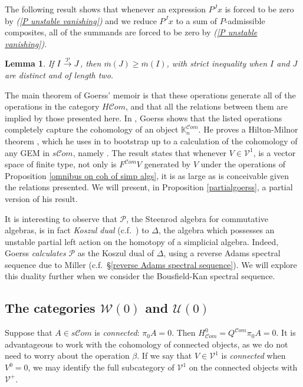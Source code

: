 \documentclass[11pt]{amsart} \renewcommand{\baselinestretch}{1.2}
\theoremstyle{plain}
\newtheorem{lem}[thm]{Lemma}
\theoremstyle{definition}
\newcommand{\scrC}{\mathscr{C}}
\newcommand{\calU}{\mathcal{U}}
\newcommand{\calP}{\mathcal{P}}
\newcommand{\calV}{\mathcal{V}}
\newcommand{\calw}{\mathcal{W}}
\newcommand{\citeBOX}[2][]{\cite[\mbox{#1}]{#2}}
\newcommand{\Palg}{{\calP}}
\newcommand{\deltaalg}{\Delta} %
\newcommand{\vect}[2]{\calV^{#1}_{#2}}
\newcommand{\HA}[1]{H#1}
\newcommand{\minDimP}{\overline{m}}
\newcommand{\produces}[3]{#3:#1\sim #2}
\renewcommand{\produces}[3]{#1\rightarrow_{#3} #2}%
\renewcommand{\produces}[3]{#1\overset{\smash{#3}}{\rightarrow} #2}%
\newcommand{\algs}{{\scrC\!\textit{om}}}
\begin{document}
\begin{Constructing cohomology operations}
The following result shows that whenever an expression $P^Jx$ is forced to be zero by \emph{(\ref{P unstable vanishing})}  and we reduce $P^Jx$ to a sum of $P$-admissible composites, all of the summands are forced to be zero by \emph{(\ref{P unstable vanishing})}.
\begin{lem}
\label{lemOnAdemChangeInMP}
If $\produces{I}{J}{\Palg}$, then $\minDimP(J) \geq \minDimP(I)$, with strict inequality when $I$ and $J$ are distinct and of length two.
\end{lem}
The main theorem of Goerss' memoir is that these operations generate all of the operations in the category $\HA{\algs}$, and that all  the relations between them  are implied by those presented here. In \cite[Chapter V]{MR1089001}, Goerss shows that the listed operations completely capture the cohomology of an object $\mathbb{K}_n^{\algs}$. He proves a Hilton-Milnor theorem \cite{GoerssHiltonMilnor.pdf}, which he uses in \citeBOX[\S11]{MR1089001} to bootstrap up to a calculation of the cohomology of any GEM in $s\algs$, namely \cite[Theorem I]{MR1089001}. The result states that whenever $V\in \vect{1}{}$,  is a  vector space of finite type, not only is 
$F^{\algs}V$
generated by $V$ under the operations of Proposition \ref{omnibus on coh of simp algs}, it is as large as is conceivable given the relations presented. We will present, in Proposition \ref{partialgoerss}, a partial version of his result.

It is  interesting to observe that $\Palg$, the Steenrod algebra for commutative algebras, is
in fact \emph{Koszul dual} (c.f.\ \cite{PriddyKoszul.pdf}) to $\deltaalg$, the algebra which possesses an unstable partial left action on the homotopy of a simplicial algebra. Indeed, Goerss \emph{calculates} $\Palg$ as the Koszul dual of $\deltaalg$, using a reverse Adams spectral sequence due to Miller \cite{MillerSullivanConjecture.pdf} (c.f.\ \S\ref{reverse Adams spectral sequence}). We will explore this duality further when we consider the Bousfield-Kan spectral sequence.

\subsection{The categories $\calw(0)$ and $\calU(0)$}
Suppose that $A\in s\algs$ is \emph{connected}: $\pi_0A=0$. Then $H^0_{\algs}=Q^{\algs}\pi_0A=0$. It is advantageous to work with the cohomology of connected objects, as we do not need to worry about the operation $\beta$. If we say that $V\in \vect{1}{}$ is \emph{connected} when $V^{0}=0$, we may identify the full subcategory of $\vect{1}{}$ on the connected objects with $\vect{+}{}$.


\end{Constructing cohomology operations}
\end{document}
